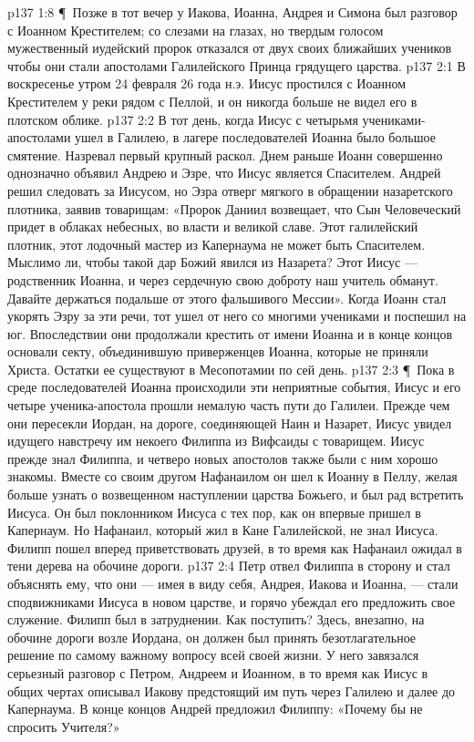 \vs p137 1:8 \P\ Позже в тот вечер у Иакова, Иоанна, Андрея и Симона был разговор с Иоанном Крестителем; со слезами на глазах, но твердым голосом мужественный иудейский пророк отказался от двух своих ближайших учеников чтобы они стали апостолами Галилейского Принца грядущего царства.
\vs p137 2:1 В воскресенье утром 24 февраля 26 года н.э. Иисус простился с Иоанном Крестителем у реки рядом с Пеллой, и он никогда больше не видел его в плотском облике.
\vs p137 2:2 В тот день, когда Иисус с четырьмя учениками\hyp{}апостолами ушел в Галилею, в лагере последователей Иоанна было большое смятение. Назревал первый крупный раскол. Днем раньше Иоанн совершенно однозначно объявил Андрею и Эзре, что Иисус является Спасителем. Андрей решил следовать за Иисусом, но Эзра отверг мягкого в обращении назаретского плотника, заявив товарищам: «Пророк Даниил возвещает, что Сын Человеческий придет в облаках небесных, во власти и великой славе. Этот галилейский плотник, этот лодочный мастер из Капернаума не может быть Спасителем. Мыслимо ли, чтобы такой дар Божий явился из Назарета? Этот Иисус --- родственник Иоанна, и через сердечную свою доброту наш учитель обманут. Давайте держаться подальше от этого фальшивого Мессии». Когда Иоанн стал укорять Эзру за эти речи, тот ушел от него со многими учениками и поспешил на юг. Впоследствии они продолжали крестить от имени Иоанна и в конце концов основали секту, объединившую приверженцев Иоанна, которые не приняли Христа. Остатки ее существуют в Месопотамии по сей день.
\vs p137 2:3 \P\ Пока в среде последователей Иоанна происходили эти неприятные события, Иисус и его четыре ученика\hyp{}апостола прошли немалую часть пути до Галилеи. Прежде чем они пересекли Иордан, на дороге, соединяющей Наин и Назарет, Иисус увидел идущего навстречу им некоего Филиппа из Вифсаиды с товарищем. Иисус прежде знал Филиппа, и четверо новых апостолов также были с ним хорошо знакомы. Вместе со своим другом Нафанаилом он шел к Иоанну в Пеллу, желая больше узнать о возвещенном наступлении царства Божьего, и был рад встретить Иисуса. Он был поклонником Иисуса с тех пор, как он впервые пришел в Капернаум. Но Нафанаил, который жил в Кане Галилейской, не знал Иисуса. Филипп пошел вперед приветствовать друзей, в то время как Нафанаил ожидал в тени дерева на обочине дороги.
\vs p137 2:4 Петр отвел Филиппа в сторону и стал объяснять ему, что они --- имея в виду себя, Андрея, Иакова и Иоанна, --- стали сподвижниками Иисуса в новом царстве, и горячо убеждал его предложить свое служение. Филипп был в затруднении. Как поступить? Здесь, внезапно, на обочине дороги возле Иордана, он должен был принять безотлагательное решение по самому важному вопросу всей своей жизни. У него завязался серьезный разговор с Петром, Андреем и Иоанном, в то время как Иисус в общих чертах описывал Иакову предстоящий им путь через Галилею и далее до Капернаума. В конце концов Андрей предложил Филиппу: «Почему бы не спросить Учителя?»
